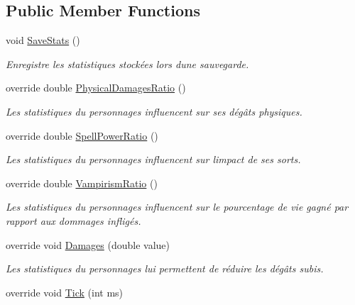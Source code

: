 \subsection*{Public Member Functions}
\begin{DoxyCompactItemize}
\item 
void \hyperlink{class_tentacle_slicers_1_1actors_1_1_player_character_a0d2e5ef0774b29ddff168c5c83c255aa}{Save\+Stats} ()
\begin{DoxyCompactList}\small\item\em Enregistre les statistiques stockées lors d\textquotesingle{}une sauvegarde. \end{DoxyCompactList}\item 
override double \hyperlink{class_tentacle_slicers_1_1actors_1_1_player_character_a1e6201247e550f29f061ac87c88c70f6}{Physical\+Damages\+Ratio} ()
\begin{DoxyCompactList}\small\item\em Les statistiques du personnages influencent sur ses dégâts physiques. \end{DoxyCompactList}\item 
override double \hyperlink{class_tentacle_slicers_1_1actors_1_1_player_character_aaeb9cd192c0caf68ed7aa994ebb6daa6}{Spell\+Power\+Ratio} ()
\begin{DoxyCompactList}\small\item\em Les statistiques du personnages influencent sur l\textquotesingle{}impact de ses sorts. \end{DoxyCompactList}\item 
override double \hyperlink{class_tentacle_slicers_1_1actors_1_1_player_character_acc7326054ba178ac92ff43ed0fbaab2d}{Vampirism\+Ratio} ()
\begin{DoxyCompactList}\small\item\em Les statistiques du personnages influencent sur le pourcentage de vie gagné par rapport aux dommages infligés. \end{DoxyCompactList}\item 
override void \hyperlink{class_tentacle_slicers_1_1actors_1_1_player_character_a40d9846096c2aaddb7112631310b240b}{Damages} (double value)
\begin{DoxyCompactList}\small\item\em Les statistiques du personnages lui permettent de réduire les dégâts subis. \end{DoxyCompactList}\item 
override void \hyperlink{class_tentacle_slicers_1_1actors_1_1_player_character_ae5043ba6bbb1d2007f0f29f61e28369c}{Tick} (int ms)

\end{DoxyCompactItemize}
